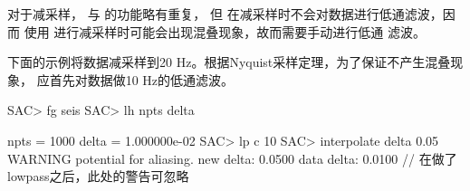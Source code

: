 对于减采样， 与  的功能略有重复，
但  在减采样时不会对数据进行低通滤波，因而
使用  进行减采样时可能会出现混叠现象，故而需要手动进行低通
滤波。

下面的示例将数据减采样到20 Hz。根据Nyquist采样定理，为了保证不产生混叠现象，
应首先对数据做10 Hz的低通滤波。
\begin{SACCode}
SAC> fg seis
SAC> lh npts delta

     npts = 1000
     delta = 1.000000e-02
SAC> lp c 10
SAC> interpolate delta 0.05
WARNING potential for aliasing. new delta: 0.0500 data delta: 0.0100
    //  在做了lowpass之后，此处的警告可忽略
\end{SACCode}
